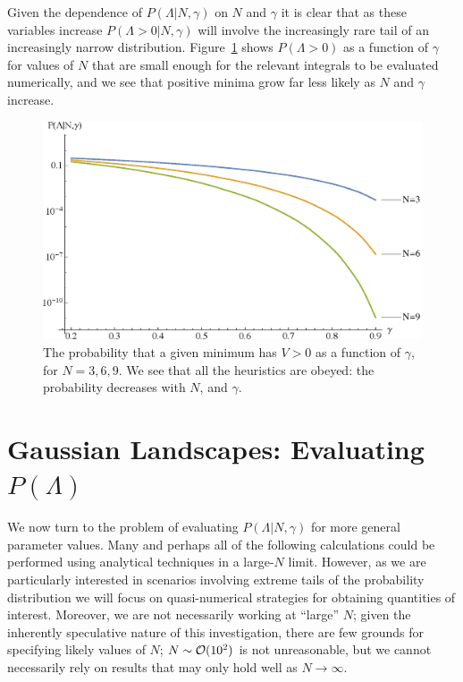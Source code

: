 \documentclass[12pt]{article}
\begin{document}
 
Given the dependence of $P(\Lambda|N,\gamma)$ on $N$ and $\gamma$ it is clear that as these variables increase $P(\Lambda>0|N,\gamma)$ will involve the increasingly rare tail of an increasingly narrow distribution. Figure~\ref{N6} shows $P(\Lambda>0)$ as a function of $\gamma$ for values of $N$ that are small enough for the relevant integrals to be evaluated numerically, and we see that positive minima grow far less likely as $N$ and $\gamma$ increase. 



\begin{figure}
  \centering
  \includegraphics[width=.6 \linewidth]{N369.eps}
  \caption{The probability that a given minimum has $V > 0$ as a function of $\gamma$, for $N=3, 6, 9$. We see that all the heuristics are obeyed: the probability decreases with $N$, and  $\gamma$.}
  \label{N6}
  \end{figure}


   


 

\section{Gaussian Landscapes: Evaluating $P(\Lambda)$} \label{PeakNumbers}

We now turn to the problem of evaluating $P(\Lambda|N,\gamma)$  for more general parameter values. Many and perhaps all of the following calculations could be performed using analytical techniques in a large-$N$ limit. However,  as we are particularly interested in scenarios involving extreme tails of  the probability distribution we will focus on quasi-numerical strategies for obtaining quantities of interest. Moreover, we are  not necessarily working at ``large'' $N$; given the inherently speculative nature of this investigation, there are few  grounds for specifying likely values of $N$;  $N\sim{\cal O}(10^2)$ is not unreasonable, but we cannot necessarily rely on results that may only hold well as $N\rightarrow \infty$. 
\end{document}
